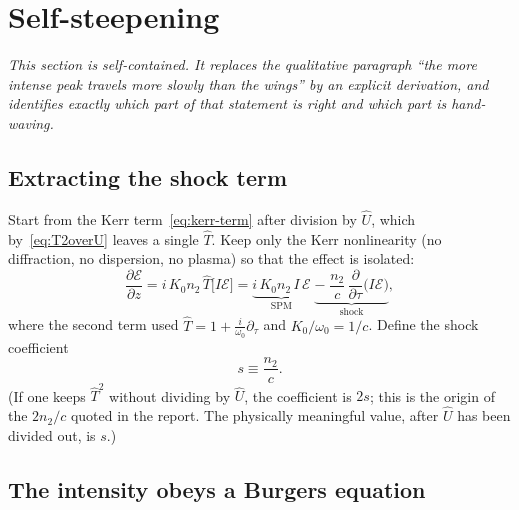\documentclass[11pt,a4paper]{article}
\begin{document}
\section{Self-steepening}
\label{sec:steepening}

\noindent
\emph{This section is self-contained. It replaces the qualitative paragraph
``the more intense peak travels more slowly than the wings'' by an explicit
derivation, and identifies exactly which part of that statement is right and
which part is hand-waving.}

\subsection{Extracting the shock term}

Start from the Kerr term~\eqref{eq:kerr-term} after division by $\hat U$, which
by~\eqref{eq:T2overU} leaves a single $\hat T$. Keep only the Kerr nonlinearity
(no diffraction, no dispersion, no plasma) so that the effect is isolated:
\begin{equation}
\label{eq:shock-model}
\frac{\partial\mathcal{E}}{\partial z}
 = i\,K_0 n_2\,\hat T\big[I\mathcal{E}\big]
 = \underbrace{i\,K_0 n_2\, I\,\mathcal{E}}_{\text{SPM}}
   \;\underbrace{-\;\frac{n_2}{c}\,\frac{\partial}{\partial\tau}\big(I\mathcal{E}\big)}_{\text{shock}},
\end{equation}
where the second term used $\hat T = 1+\tfrac{i}{\omega_0}\partial_\tau$ and
$K_0/\omega_0=1/c$. Define the shock coefficient
\begin{equation}
s \equiv \frac{n_2}{c} .
\end{equation}
(If one keeps $\hat T^2$ without dividing by $\hat U$, the coefficient is $2s$;
this is the origin of the $2n_2/c$ quoted in the report. The physically
meaningful value, after $\hat U$ has been divided out, is $s$.)

\subsection{The intensity obeys a Burgers equation}
\end{document}
